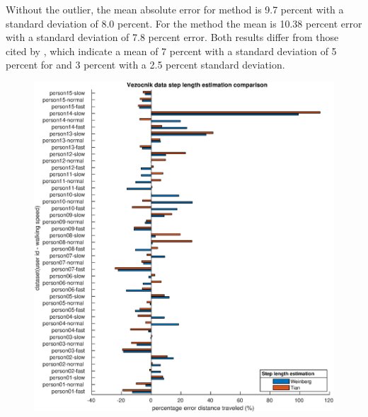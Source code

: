  Without the outlier, the mean absolute error for \citet{Tian2016} method is 9.7 percent with a standard deviation of 8.0 percent. For the \citet{weinberg} method the mean is 10.38 percent error with a standard deviation of 7.8 percent error. Both results differ from those cited by \cite{Vezocnik2019}, which indicate a mean of 7 percent with a standard deviation of 5 percent for \citet{Tian2016} and 3 percent with a 2.5 percent standard deviation.

\par

\begin{figure}[H]
	\centering
	\includegraphics[width=\linewidth]{images/20201113_1943_wienberg_vs_tian_vezocnik_data_1}
	\caption{}
	\label{fig:202011131943_wienberg_vs_tian_vezocnik_data1}
\end{figure}
 
